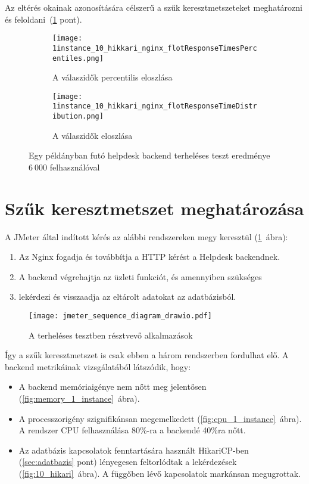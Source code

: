 Az eltérés okainak azonosítására célszerű a szűk keresztmetszeteket meghatározni és feloldani~(\ref{sec:bottleneck} pont).

\begin{figure}[hbt]
	\begin{subfigure}{.9\textwidth}
		\centering
		\texttt{[image: 1instance\_10\_hikkari\_nginx\_flotResponseTimesPercentiles.png]}  
		\caption{A válaszidők percentilis eloszlása}
	\end{subfigure}
	\begin{subfigure}{.9\textwidth}
		\centering
		\texttt{[image: 1instance\_10\_hikkari\_nginx\_flotResponseTimeDistribution.png]}  
		\caption{A válaszidők eloszlása}
	\end{subfigure}
	
	\caption[Helpdesk backend terheléses teszt egy példánnyal]{Egy példányban futó helpdesk backend terheléses teszt eredménye $6~000$ felhasználóval}
\end{figure}

\pagebreak

\section{Szűk keresztmetszet meghatározása}\label{sec:bottleneck}
A JMeter által indított kérés az alábbi rendszereken megy keresztül (\ref{fig:jmeter_sequence}~ábra):
\begin{enumerate}
	\item Az Nginx fogadja és továbbítja a HTTP kérést a Helpdesk backendnek.
	\item A backend végrehajtja az üzleti funkciót, és amennyiben szükséges
	\item lekérdezi és visszaadja az eltárolt adatokat az adatbázisból. 
\end{enumerate}

\begin{figure}[hbt] 
	\centering
	\texttt{[image: jmeter\_sequence\_diagram\_drawio.pdf]}
	\caption{A terheléses tesztben résztvevő alkalmazások}
	\label{fig:jmeter_sequence}
\end{figure}



Így a szűk keresztmetszet is csak ebben a három rendszerben fordulhat elő. A backend metrikáinak vizsgálatából látszódik, hogy:
\begin{itemize}
	\item A backend memóriaigénye nem nőtt meg jelentősen (\ref{fig:memory_1_instance}~ábra).
	
	\item A processzorigény szignifikánsan megemelkedett (\ref{fig:cpu_1_instance}~ábra). A rendszer CPU felhasználása 80\%-ra a backendé 40\%ra nőtt.
	
	\item Az adatbázis kapcsolatok fenntartására használt HikariCP-ben (\ref{sec:adatbazis} pont) lényegesen feltorlódtak a lekérdezések (\ref{fig:10_hikari}~ábra). A függőben lévő kapcsolatok markánsan megugrottak.
\end{itemize}


